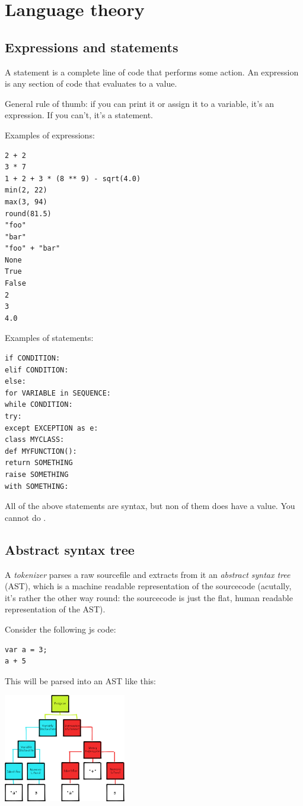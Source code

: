 \section{Language theory}

\subsection{Expressions and statements}

A statement is a complete line of code that performs some action. 
An expression is any section of code that evaluates to a value.

General rule of thumb: if you can print it or assign it to a variable, it's an expression. If you can't, it's a statement. 

Examples of expressions: 
\begin{lstlisting}
2 + 2
3 * 7
1 + 2 + 3 * (8 ** 9) - sqrt(4.0)
min(2, 22)
max(3, 94)
round(81.5)
"foo"
"bar"
"foo" + "bar"
None
True
False
2
3
4.0
\end{lstlisting}

Examples of statements: 
\begin{lstlisting}
if CONDITION:
elif CONDITION:
else:
for VARIABLE in SEQUENCE:
while CONDITION:
try:
except EXCEPTION as e:
class MYCLASS:
def MYFUNCTION():
return SOMETHING
raise SOMETHING
with SOMETHING:
\end{lstlisting}
All of the above statements are syntax, but non of them does have a value. You cannot do .


\subsection{Abstract syntax tree}
A \emph{tokenizer} parses a raw sourcefile and extracts from it an \emph{abstract syntax tree} (AST), which is a machine readable representation of the sourcecode (acutally, it's rather the other way round: the sourcecode is just the flat, human readable representation of the AST).

Consider the following js code: 

\begin{lstlisting}
var a = 3;
a + 5
\end{lstlisting}

This will be parsed into an AST like this: 

\includegraphics[width=0.4\textwidth]{images/ast.png}

